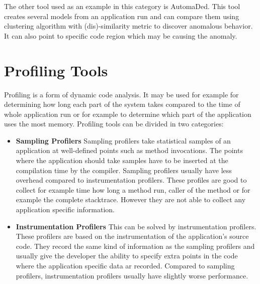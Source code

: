 The other tool used as an example in this category is AutomaDed. This tool creates several models from an application run and can compare them using clustering algorithm with (dis)-similarity metric to discover anomalous behavior. It can also point to specific code region which may be causing the anomaly.

\section{Profiling Tools}
Profiling is a form of dynamic code analysis. It may be used for example for determining how long each part of the system takes compared to the time of whole application run or for example to determine which part of the application uses the most memory. Profiling tools can be divided in two categories:
\begin{itemize}
	\item \textbf{Sampling Profilers} \newline
Sampling profilers take statistical samples of an application at well-defined points such as method invocations. The points where the application should take samples have to be inserted at the compilation time by the compiler. Sampling profilers usually have less overhead compared to instrumentation profilers. These profiles are good to collect for example time how long a method run, caller of the method or for example the complete stacktrace. However they are not able to collect any application specific information.
	\item \textbf{Instrumentation Profilers} \newline
This can be solved by instrumentation profilers. These profilers are based on the instrumentation of the application's source code. They record the same kind of information as the sampling profilers and usually give the developer the ability to specify extra points in the code where the application specific data ar recorded. Compared to sampling profilers, instrumentation profilers usually have slightly worse performance.
\end{itemize}

